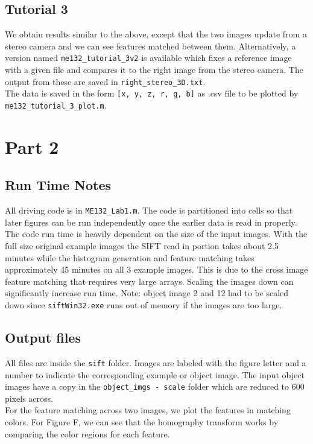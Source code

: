 \documentclass[10pt, titlepage, onecolumn, fleqn]{article}
\begin{document}
\subsection{Tutorial 3}
We obtain results similar to the above, except that the two images update from a stereo camera and we can see features matched between them. Alternatively, a version named \verb|me132_tutorial_3v2| is available which fixes a reference image with a given file and compares it to the right image from the stereo camera. The output from these are saved in \verb|right_stereo_3D.txt|.\\
The data is saved in the form \verb|[x, y, z, r, g, b]| as .csv file to be plotted by \verb|me132_tutorial_3_plot.m|.

\section{Part 2}

\subsection{Run Time Notes}
All driving code is in \verb|ME132_Lab1.m|. The code is partitioned into cells so that later figures can be run independently once the earlier data is read in properly. The code run time is heavily dependent on the size of the input images. With the full size original example images the SIFT read in portion takes about 2.5 minutes while the histogram generation and feature matching takes approximately 45 minutes on all 3 example images. This is due to the cross image feature matching that requires very large arrays. Scaling the images down can significantly increase run time.
Note: object image 2 and 12 had to be scaled down since \verb|siftWin32.exe| runs out of memory if the images are too large.

\subsection{Output files}
All files are inside the \verb|sift| folder. Images are labeled with the figure letter and a number to indicate the corresponding example or object image. The input object images have a copy in the \verb|object_imgs - scale| folder which are reduced to 600 pixels across.\\
For the feature matching across two images, we plot the features in matching colors. For Figure F, we can see that the homography transform works by comparing the color regions for each feature.
\end{document}
